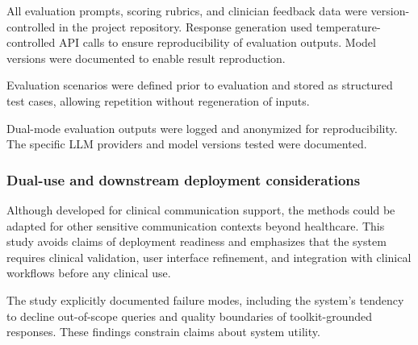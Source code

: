 All evaluation prompts, scoring rubrics, and clinician feedback data were version-controlled in the project repository. Response generation used temperature-controlled API calls to ensure reproducibility of evaluation outputs. Model versions were documented to enable result reproduction.

Evaluation scenarios were defined prior to evaluation and stored as structured test cases, allowing repetition without regeneration of inputs.

Dual-mode evaluation outputs were logged and anonymized for reproducibility. The specific LLM providers and model versions tested were documented.

\subsubsection{Dual-use and downstream deployment considerations}

Although developed for clinical communication support, the methods could be adapted for other sensitive communication contexts beyond healthcare. This study avoids claims of deployment readiness and emphasizes that the system requires clinical validation, user interface refinement, and integration with clinical workflows before any clinical use.

The study explicitly documented failure modes, including the system's tendency to decline out-of-scope queries and quality boundaries of toolkit-grounded responses. These findings constrain claims about system utility.
